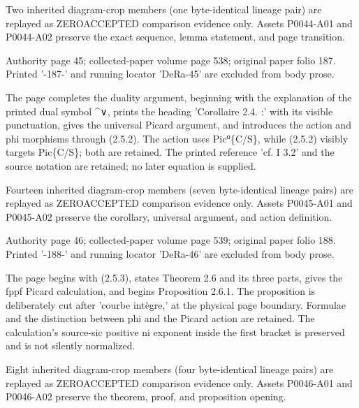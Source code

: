 \documentclass[11pt,a4paper]{article}
\begin{document}
Two inherited diagram-crop members (one byte-identical lineage pair) are replayed as ZERO\textunderscore{}ACCEPTED comparison evidence only. Assets P0044-A01 and P0044-A02 preserve the exact sequence, lemma statement, and page transition.


\par\medskip
\hypertarget{D018-P0045}{}
\par\smallskip
Authority page 45; collected-paper volume page 538; original paper folio 187. Printed '-187-' and running locator 'DeRa-45' are excluded from body prose.

The page completes the duality argument, beginning with the explanation of the printed dual symbol \textasciicircum{}∨, prints the heading 'Corollaire 2.4. :' with its visible punctuation, gives the universal Picard argument, and introduces the action and phi morphisms through (2.5.2). The action uses Pic⁰\textunderscore{}\{C/S\}, while (2.5.2) visibly targets Pic\textunderscore{}\{C/S\}; both are retained. The printed reference 'cf. I 3.2' and the source notation are retained; no later equation is supplied.

Fourteen inherited diagram-crop members (seven byte-identical lineage pairs) are replayed as ZERO\textunderscore{}ACCEPTED comparison evidence only. Assets P0045-A01 and P0045-A02 preserve the corollary, universal argument, and action definition.


\par\medskip
\hypertarget{D018-P0046}{}
\par\smallskip
Authority page 46; collected-paper volume page 539; original paper folio 188. Printed '-188-' and running locator 'DeRa-46' are excluded from body prose.

The page begins with (2.5.3), states Theorem 2.6 and its three parts, gives the fppf Picard calculation, and begins Proposition 2.6.1. The proposition is deliberately cut after 'courbe intègre,' at the physical page boundary. Formulae and the distinction between phi and the Picard action are retained. The calculation's source-sic positive n\textunderscore{}i exponent inside the first bracket is preserved and is not silently normalized.

Eight inherited diagram-crop members (four byte-identical lineage pairs) are replayed as ZERO\textunderscore{}ACCEPTED comparison evidence only. Assets P0046-A01 and P0046-A02 preserve the theorem, proof, and proposition opening.
\end{document}
